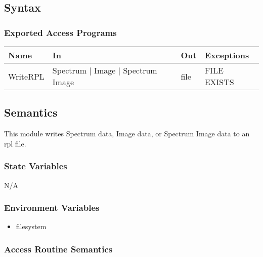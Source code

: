 \documentclass[12pt, titlepage]{article}
\begin{document}
\subsection{Syntax}

\subsubsection{Exported Access Programs}

\begin{center}
    \begin{tabular}{p{2cm} p{4cm} p{4cm} p{4cm}}
        \hline
        \textbf{Name} & \textbf{In} & \textbf{Out} & \textbf{Exceptions} \\
        \hline
        WriteRPL & Spectrum $|$ Image $|$ Spectrum Image & file & FILE EXISTS \\
        \hline
    \end{tabular}
\end{center}

\subsection{Semantics}
This module writes Spectrum data, Image data, or Spectrum Image data to an rpl file.

\subsubsection{State Variables}
N/A

\subsubsection{Environment Variables}
\begin{itemize}
    \item filesystem
\end{itemize}

\subsubsection{Access Routine Semantics}
\end{document}

